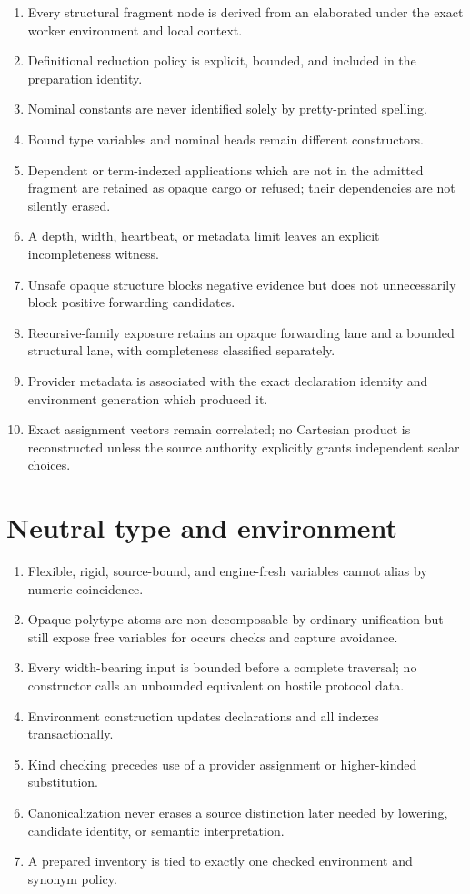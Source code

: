 \documentclass[10pt,letterpaper,oneside]{report}
\newcommand{\code}[1]{\texttt{\detokenize{#1}}}
\begin{document}
\begin{enumerate}
  \item Every structural fragment node is derived from an elaborated \code{Expr} under the exact worker environment and local context.
  \item Definitional reduction policy is explicit, bounded, and included in the preparation identity.
  \item Nominal constants are never identified solely by pretty-printed spelling.
  \item Bound type variables and nominal heads remain different constructors.
  \item Dependent or term-indexed applications which are not in the admitted fragment are retained as opaque cargo or refused; their dependencies are not silently erased.
  \item A depth, width, heartbeat, or metadata limit leaves an explicit incompleteness witness.
  \item Unsafe opaque structure blocks negative evidence but does not unnecessarily block positive forwarding candidates.
  \item Recursive-family exposure retains an opaque forwarding lane and a bounded structural lane, with completeness classified separately.
  \item Provider metadata is associated with the exact declaration identity and environment generation which produced it.
  \item Exact assignment vectors remain correlated; no Cartesian product is reconstructed unless the source authority explicitly grants independent scalar choices.
\end{enumerate}

\section{Neutral type and environment}

\begin{enumerate}
  \item Flexible, rigid, source-bound, and engine-fresh variables cannot alias by numeric coincidence.
  \item Opaque polytype atoms are non-decomposable by ordinary unification but still expose free variables for occurs checks and capture avoidance.
  \item Every width-bearing input is bounded before a complete traversal; no constructor calls an unbounded \code{length} equivalent on hostile protocol data.
  \item Environment construction updates declarations and all indexes transactionally.
  \item Kind checking precedes use of a provider assignment or higher-kinded substitution.
  \item Canonicalization never erases a source distinction later needed by lowering, candidate identity, or semantic interpretation.
  \item A prepared inventory is tied to exactly one checked environment and synonym policy.
\end{enumerate}
\end{document}
